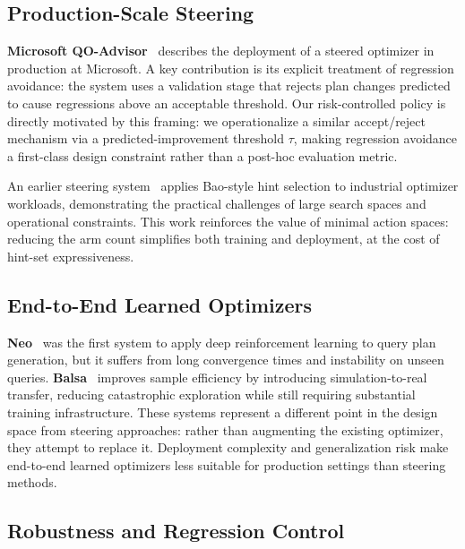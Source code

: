 \documentclass[sigconf,natbib=false]{article}
\newcommand{\threshold}{\tau}
\begin{document}
\subsection{Production-Scale Steering}

\textbf{Microsoft QO-Advisor}~\cite{Ding2022} describes the deployment of a steered optimizer
in production at Microsoft. A key contribution is its explicit treatment of regression
avoidance: the system uses a validation stage that rejects plan changes predicted to cause
regressions above an acceptable threshold. Our risk-controlled policy is directly motivated by
this framing: we operationalize a similar accept/reject mechanism via a predicted-improvement
threshold $\threshold$, making regression avoidance a first-class design constraint rather
than a post-hoc evaluation metric.

An earlier steering system~\cite{Marcus2021Steering} applies Bao-style hint selection to
industrial optimizer workloads, demonstrating the practical challenges of large search spaces
and operational constraints. This work reinforces the value of minimal action spaces: reducing
the arm count simplifies both training and deployment, at the cost of hint-set expressiveness.

\subsection{End-to-End Learned Optimizers}

\textbf{Neo}~\cite{Marcus2019Neo} was the first system to apply deep reinforcement learning
to query plan generation, but it suffers from long convergence times and instability on
unseen queries. \textbf{Balsa}~\cite{Yang2022Balsa} improves sample efficiency by introducing
simulation-to-real transfer, reducing catastrophic exploration while still requiring
substantial training infrastructure. These systems represent a different point in the
design space from steering approaches: rather than augmenting the existing optimizer, they
attempt to replace it. Deployment complexity and generalization risk make end-to-end learned
optimizers less suitable for production settings than steering methods.

\subsection{Robustness and Regression Control}
\end{document}
